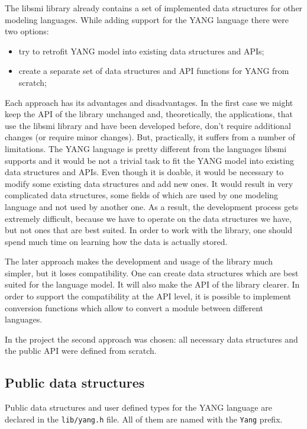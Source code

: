 \documentclass[conference]{IEEEtran}
\begin{document}
The libsmi library already contains a set of implemented data structures for other modeling languages.
While adding support for the YANG language there were two options:
\begin{itemize}
\item try to retrofit YANG model into existing data structures and APIs;
\item create a separate set of data structures and API functions for YANG from scratch;
\end{itemize}

Each approach has its advantages and disadvantages. 
In the first case we might keep the API of the library unchanged and, theoretically, 
the applications, that use the libsmi library and have been developed before, don't require additional changes (or require minor changes). 
But, practically, it suffers from a number of limitations. 
The YANG language is pretty different from the languages libsmi supports and it would be not a trivial task to fit the YANG model into existing data structures and APIs.
Even though it is doable, it would be necessary to modify some existing data structures and add new ones. 
It would result in very complicated data structures,
some fields of which are used by one modeling language and not used by another one. 
As a result, the development process gets extremely difficult, because we have to operate on the data structures we have, but not ones that are best suited. 
In order to work with the library, one should spend much time on learning how  the data is actually stored. 

The later approach makes the development and usage of the library much simpler, 
but it loses compatibility. One can create data structures which are best suited for the language model. 
It will also make the API of the library clearer. In order to support the compatibility at the API level, 
it is possible to implement conversion functions which allow to convert a module between different languages. 

In the project the second approach was chosen: all necessary data structures and the public API were defined from scratch.

\subsection{Public data structures}
Public data structures and user defined types for the YANG language are declared in the \texttt{lib/yang.h} file. 
All of them are named with the \texttt{Yang} prefix. 
\end{document}
